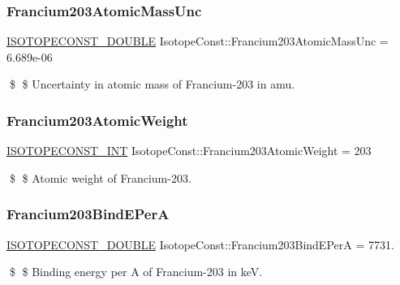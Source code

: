 \subsubsection{\texorpdfstring{Francium203\+Atomic\+Mass\+Unc}{Francium203AtomicMassUnc}}
{\footnotesize\ttfamily \mbox{\hyperlink{group___isotope_const-_macros_ga8f45a7272ce02c0b4c65c44636ed719a}{I\+S\+O\+T\+O\+P\+E\+C\+O\+N\+S\+T\+\_\+\+D\+O\+U\+B\+LE}} Isotope\+Const\+::\+Francium203\+Atomic\+Mass\+Unc = 6.\+689e-\/06}

\$ \$ Uncertainty in atomic mass of Francium-\/203 in amu. \mbox{\label{group___isotope_const-_francium-_fr203_ga1b4939f9e0bd0faef71e9590f3103c31}} 
\subsubsection{\texorpdfstring{Francium203\+Atomic\+Weight}{Francium203AtomicWeight}}
{\footnotesize\ttfamily \mbox{\hyperlink{group___isotope_const-_macros_ga5f18360b3e99483a35c32d789e62621c}{I\+S\+O\+T\+O\+P\+E\+C\+O\+N\+S\+T\+\_\+\+I\+NT}} Isotope\+Const\+::\+Francium203\+Atomic\+Weight = 203}

\$ \$ Atomic weight of Francium-\/203. \mbox{\label{group___isotope_const-_francium-_fr203_gaa6d9b51f1deb9b124f057533d9cc60e7}} 
\subsubsection{\texorpdfstring{Francium203\+Bind\+E\+PerA}{Francium203BindEPerA}}
{\footnotesize\ttfamily \mbox{\hyperlink{group___isotope_const-_macros_ga8f45a7272ce02c0b4c65c44636ed719a}{I\+S\+O\+T\+O\+P\+E\+C\+O\+N\+S\+T\+\_\+\+D\+O\+U\+B\+LE}} Isotope\+Const\+::\+Francium203\+Bind\+E\+PerA = 7731.}

\$ \$ Binding energy per A of Francium-\/203 in keV. \mbox{\label{group___isotope_const-_francium-_fr203_ga3b78e77a0264bb019f5459ab9aeba04c}} 
